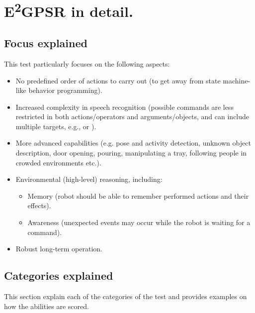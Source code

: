 \chapter[EEGPSR in detail]{E\textsuperscript{2}GPSR in detail.}
\label{chap:eegpsr-appendix}

\section{Focus explained}
\label{sec:eegpsr-focus-details}
This test particularly focuses on the following aspects:
\begin{itemize}
	\item No predefined order of actions to carry out (to get away from state machine-like behavior programming).

	\item Increased complexity in speech recognition (possible commands are less restricted in both actions/operators and arguments/objects, and can include multiple targets, e.g.,  or ).

	\item More advanced capabilities (e.g. pose and activity detection, unknown object description, door opening, pouring, manipulating a tray, following people in crowded environments etc.).

	\item Environmental (high-level) reasoning, including:
	  \begin{itemize}
		\item Memory (robot should be able to remember performed actions and their effects).
		\item Awareness (unexpected events may occur while the robot is waiting for a command).
	  \end{itemize}

  \item Robust long-term operation.

\end{itemize}

%
%
\section{Categories explained}
\label{sec:eegpsr-categories-explained}
This section explain each of the categories of the test and provides examples on how the abilities are scored.

